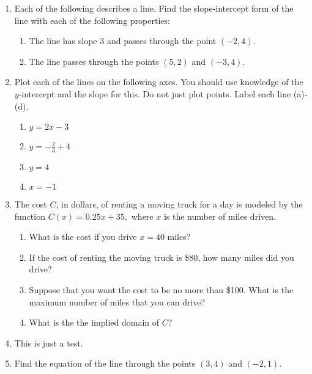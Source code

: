 \documentclass{article}
\providecommand{\tightlist}{%
  \setlength{\itemsep}{0pt}\setlength{\parskip}{0pt}}
\begin{document}
\begin{enumerate}
\item Each of the following describes a line. Find the slope-intercept form of
the line with each of the following properties:

\begin{enumerate}
\def\labelenumi{\arabic{enumi}.}
\item
  The line has slope 3 and passes through the point \((-2,4)\).
\item
  The line passes through the points \((5,2)\) and \((-3,4)\).
\end{enumerate}
\item Plot each of the lines on the following axes. You should use knowledge
of the \(y\)-intercept and the slope for this. Do not just plot points.
Label each line (a)-(d).

\begin{enumerate}
\def\labelenumi{\arabic{enumi}.}
\tightlist
\item
  \(y=2x-3\)
\item
  \(y=-\frac{2}{3} + 4 \)
\item
  \(y=4\)
\item
  \(x=-1\)
\end{enumerate}
\item The cost \(C\), in dollars, of renting a moving truck for a day is
modeled by the function \(C(x)=0.25x+35,\) where \(x\) is the number of
miles driven.

\begin{enumerate}
\def\labelenumi{\arabic{enumi}.}
\tightlist
\item
  What is the cost if you drive \(x=40\) miles?
\item
  If the cost of renting the moving truck is \$80, how many miles did
  you drive?
\item
  Suppose that you want the cost to be no more than \$100. What is the
  maximum number of miles that you can drive?
\item
  What is the the implied domain of \(C\)?
\end{enumerate}
\item This is just a test.
\item Find the equation of the line through the points \((3,4)\) and
\((-2,1)\).

\end{enumerate}
\end{document}
